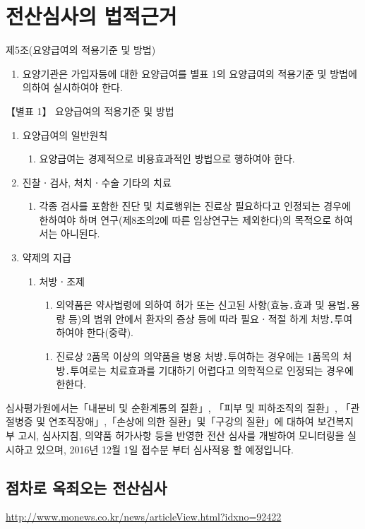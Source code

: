 \section{전산심사의 법적근거}
제5조(요양급여의 적용기준 및 방법)
\begin{enumerate}[①]\tightlist
\item 요양기관은 가입자등에 대한 요양급여를 별표 1의 요양급여의 적용기준 및 방법에 의하여 실시하여야 한다.
\end{enumerate}
【별표 1】 요양급여의 적용기준 및 방법
\begin{enumerate}[1.]\tightlist
\item 요양급여의 일반원칙
	\begin{enumerate}[다.]\tightlist
	\item 요양급여는 경제적으로 비용효과적인 방법으로 행하여야 한다.
	\end{enumerate}
\item 진찰ㆍ검사, 처치ㆍ수술 기타의 치료
	\begin{enumerate}[가.]
	\item 각종 검사를 포함한 진단 및 치료행위는 진료상 필요하다고 인정되는 경우에 한하여야 하며 연구(제8조의2에 따른 임상연구는 제외한다)의 목적으로 하여서는 아니된다.
	\end{enumerate}
\item 약제의 지급
	\begin{enumerate}[가.]\tightlist
	\item 처방ㆍ조제
		\begin{enumerate}[(2)]\tightlist
		\item 의약품은 약사법령에 의하여 허가 또는 신고된 사항(효능․효과 및 용법․용량 등)의 범위 안에서 환자의 증상 등에 따라 필요ㆍ적절 하게 처방․투여 하여야 한다(중략).
		\end{enumerate}
		\begin{enumerate}[(6)]\tightlist
		\item 진료상 2품목 이상의 의약품을 병용 처방․투여하는 경우에는 1품목의 처방․투여로는 치료효과를 기대하기 어렵다고 의학적으로 인정되는 경우에 한한다.
		\end{enumerate}
	\end{enumerate}	
\end{enumerate}

심사평가원에서는「내분비 및 순환계통의 질환」, 「피부 및 피하조직의 질환」, 「관절병증 및 연조직장애」,「손상에 의한 질환」및「구강의 질환」에 대하여 보건복지부 고시, 심사지침, 의약품 허가사항 등을 반영한 전산 심사를 개발하여 모니터링을 실시하고 있으며, 2016년 12월 1일 접수분 부터 심사적용 할 예정입니다.

\subsection{점차로 옥죄오는 전산심사}
\url{http://www.monews.co.kr/news/articleView.html?idxno=92422}